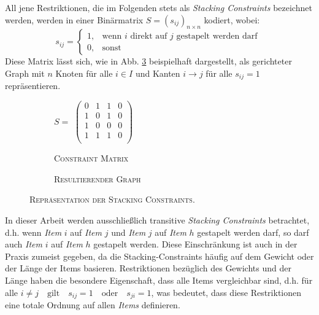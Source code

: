 All jene Restriktionen, die im Folgenden stets als \textit{Stacking Constraints} bezeichnet werden, werden in einer Binärmatrix $S = (s_{ij})_{n \times n}$ kodiert, wobei:
\[
    s_{ij} =
\begin{cases}
    1, & \text{wenn $i$ direkt auf $j$ gestapelt werden darf }\\
    0, & \text{sonst}
\end{cases}
\]
Diese Matrix lässt sich, wie in Abb. \ref{fig:matrix_to_graph} beispielhaft dargestellt,
als gerichteter Graph mit $n$ Knoten für alle $i \in I$ und Kanten $i \rightarrow j$ für alle $s_{ij} = 1$ repräsentieren.
\begin{figure}[H]
  \begin{subfigure}[b]{0.5\textwidth}
  \centering
    $S =$
    $\left(
    \begin{array}{rrrr}
    0 & 1 & 1 & 0 \\
    1 & 0 & 1 & 0 \\
    1 & 0 & 0 & 0 \\
    1 & 1 & 1 & 0 \\
    \end{array} \right) $
    \caption{\textsc{Constraint Matrix}}
    \label{fig:constraint_matrix}
  \end{subfigure}
  \hfill
  \begin{subfigure}[b]{0.5\textwidth}
  \centering
    \caption{\textsc{Resultierender Graph}}
    \label{fig:resulting_graph}
  \end{subfigure}
  \caption{\textsc{Repräsentation der Stacking Constraints.}}
  \label{fig:matrix_to_graph}
\end{figure}
In dieser Arbeit werden ausschließlich transitive \textit{Stacking Constraints} betrachtet, d.h.
wenn \textit{Item} $i$ auf \textit{Item} $j$ und \textit{Item} $j$ auf \textit{Item} $h$ gestapelt werden darf,
so darf auch \textit{Item} $i$ auf \textit{Item} $h$ gestapelt werden.\newline
Diese Einschränkung ist auch in der Praxis zumeist gegeben, da die Stacking-Constraints häufig auf dem Gewicht
oder der Länge der Items basieren. Restriktionen bezüglich des Gewichts und der Länge haben die besondere Eigenschaft, dass alle Items vergleichbar sind, d.h. für alle $i \neq j  \quad \text{gilt} \quad s_{ij} = 1 \quad \text{oder} \quad s_{ji} = 1$, was bedeutet, dass diese Restriktionen eine totale Ordnung auf allen \textit{Items} definieren.

